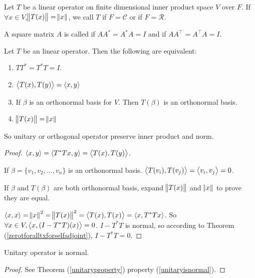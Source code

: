 \begin{definition}
    Let $T$ be a linear operator on finite dimensional inner product space $V$ over $F$. If $\forall x \in V$,$\norm{T(x)} = \norm{x}$, we call $T$  if $F = \mathcal{C}$ or  if $F=\mathcal{R}$.
\end{definition}

\begin{definition}
    A square matrix $A$ is called  if $AA^* = A^*A = I$ and  if $AA^\top = A^\top A = I$.
\end{definition}

\begin{theorem}\label{unitaryproperty}
    Let $T$ be an linear operator. Then the following are equivalent:
    \begin{enumerate}
        \item $TT^* = T^* T = I$.\label{unitaryisnormal}
        \item $\left\langle \displaystyle T(x), T(y) \right\rangle = \left\langle \displaystyle x, y \right\rangle$
        \item If $\beta$ is an orthonormal basis for $V$. Then $T(\beta)$ is an orthonormal basis.
        \item $\norm{T(x)} = \norm{x}$
    \end{enumerate}
    
    So unitary or orthogonal operator preserve inner product and norm.
\end{theorem}
\begin{proof}
    $\left\langle \displaystyle x, y \right\rangle = \left\langle \displaystyle T^* T x, y \right\rangle = \left\langle \displaystyle T(x), T(y) \right\rangle$.
    
    If $\beta = \{v_1,v_2,\dots,v_n \}$ is an orthonormal basis. $\left\langle \displaystyle T(v_i), T(v_j) \right\rangle = \left\langle \displaystyle v_i, v_j \right\rangle = 0$.
    
    If $\beta$ and $T(\beta)$ are both orthonormal basis, expand $\norm{T(x)}$ and $\norm{x}$ to prove they are equal.
    
    $\left\langle \displaystyle x, x \right\rangle = \norm{x}^2 = \norm{T(x)}^2 = \left\langle \displaystyle T(x), T(x) \right\rangle = \left\langle \displaystyle x, T^*Tx \right\rangle$. So $\forall x \in V, \left\langle \displaystyle x, (I - T^*T)(x) \right\rangle = 0$. $I - T^*T$ is normal, so according to Theorem (\ref{zerotforalltxforselfadjoint}), $I - T^* T = 0$.
\end{proof}

\begin{theorem}
    Unitary operator is normal.    
\end{theorem}
\begin{proof}
    See Theorem (\ref{unitaryproperty}) property (\ref{unitaryisnormal}).
\end{proof}



